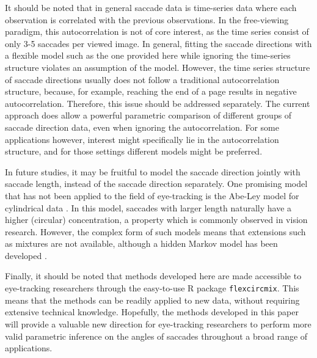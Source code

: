 It should be noted that in general saccade data is time-series data where each observation is correlated with the previous observations. In the free-viewing paradigm, this autocorrelation is not of core interest, as the time series consist of only 3-5 saccades per viewed image. In general, fitting the saccade directions with a flexible model such as the one provided here while ignoring the time-series structure violates an assumption of the model. However, the time series structure of saccade directions usually does not follow a traditional autocorrelation structure, because, for example, reaching the end of a page results in negative autocorrelation. Therefore, this issue should be addressed separately. The current approach does allow a powerful parametric comparison of different groups of saccade direction data, even when ignoring the autocorrelation. For some applications however, interest might specifically lie in the autocorrelation structure, and for those settings different models might be preferred.

In future studies, it may be fruitful to model the saccade direction jointly with saccade length, instead of the saccade direction separately. One promising model that has not been applied to the field of eye-tracking is the Abe-Ley model for cylindrical data \citep{abe2016tractable}. In this model, saccades with larger length naturally have a higher (circular) concentration, a property which is commonly observed in vision research. However, the complex form of such models means that extensions such as mixtures are not available, although a hidden Markov model has been developed \citep{lagona2015hidden}.

Finally, it should be noted that methods developed here are made accessible to eye-tracking researchers through the easy-to-use R package \texttt{flexcircmix}. This means that the methods can be readily applied to new data, without requiring extensive technical knowledge. Hopefully, the methods developed in this paper will provide a valuable new direction for eye-tracking researchers to perform more valid parametric inference on the angles of saccades throughout a broad range of applications.



